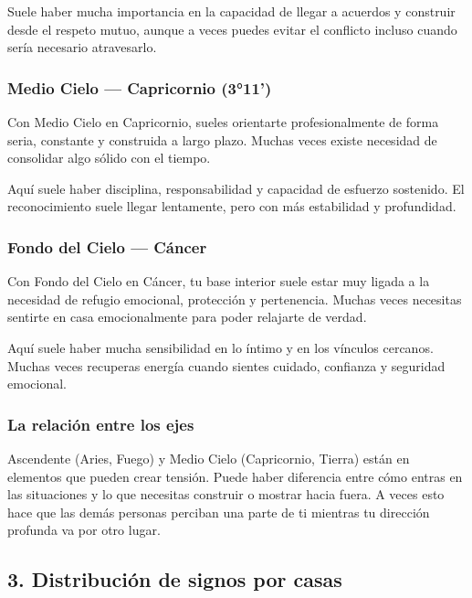 \documentclass[11pt,a4paper]{article}
\begin{document}
Suele haber mucha importancia en la capacidad de llegar a acuerdos y construir desde el respeto mutuo, aunque a veces puedes evitar el conflicto incluso cuando sería necesario atravesarlo.

\subsubsection*{Medio Cielo — Capricornio (3°11')}
Con Medio Cielo en Capricornio, sueles orientarte profesionalmente de forma seria, constante y construida a largo plazo. Muchas veces existe necesidad de consolidar algo sólido con el tiempo.

Aquí suele haber disciplina, responsabilidad y capacidad de esfuerzo sostenido. El reconocimiento suele llegar lentamente, pero con más estabilidad y profundidad.

\subsubsection*{Fondo del Cielo — Cáncer}
Con Fondo del Cielo en Cáncer, tu base interior suele estar muy ligada a la necesidad de refugio emocional, protección y pertenencia. Muchas veces necesitas sentirte en casa emocionalmente para poder relajarte de verdad.

Aquí suele haber mucha sensibilidad en lo íntimo y en los vínculos cercanos. Muchas veces recuperas energía cuando sientes cuidado, confianza y seguridad emocional.

\subsubsection*{La relación entre los ejes}
Ascendente (Aries, Fuego) y Medio Cielo (Capricornio, Tierra) están en elementos que pueden crear tensión. Puede haber diferencia entre cómo entras en las situaciones y lo que necesitas construir o mostrar hacia fuera. A veces esto hace que las demás personas perciban una parte de ti mientras tu dirección profunda va por otro lugar.

\vspace{0.5cm}

\subsection{3. Distribución de signos por casas}
\end{document}

